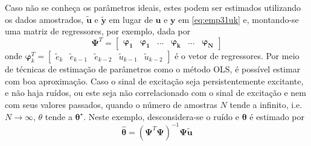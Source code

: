 \begin{exmp}
   Caso não se conheça os parâmetros ideais, estes podem ser estimados utilizando os dados amostrados, $\tilde{\bm{u}}$ e $\tilde{\bm{y}}$ em lugar de $\bm{u}$ e $\bm{y}$ em \eqref{eq:emp31uk} e, montando-se uma matriz de regressores, por exemplo, dada por
   \begin{equation*}
      \bm{\Psi}^T=\begin{bmatrix} \bm{\varphi_1} & \bm{\varphi_1} & \dots & \bm{\varphi_k}  & \dots & \bm{\varphi_N} \end{bmatrix}
   \end{equation*}
   onde $\bm{\varphi}^T_k =\begin{bmatrix} \tilde{e}_{k} & \tilde{e}_{k-1} & \tilde{e}_{k-2} & \tilde{u}_{k-1} & \tilde{u}_{k-2} \end{bmatrix}$ é o vetor de regressores.
   Por meio de técnicas de estimação de parâmetros como o método OLS, é possível estimar com boa aproximação.  
   Caso o sinal de excitação seja persistentemente excitante, e não haja ruídos, ou este seja não correlacionado com o sinal de excitação e nem com seus valores passados, quando o número de amostras $N$ tende a infinito, i.e. $N \to \infty$, $\theta$ tende a $\bm{\theta}^\star$.
   Neste exemplo, desconsidera-se o ruído e $\bm{\theta}$ é estimado por
   \begin{equation*}
      \hat{\bm{\theta}} = (\bm{\Psi}^T\bm{\Psi})^{-1}\bm{\Psi}\tilde{\bm{u}}
   \label{eq:}
   \end{equation*}
   

\end{exmp}
